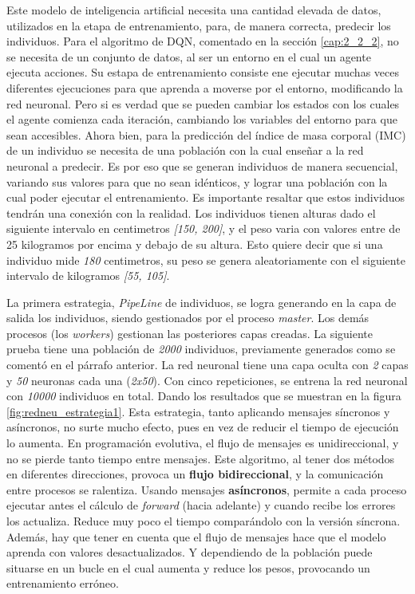 	Este modelo de inteligencia artificial necesita una cantidad elevada de datos, utilizados en la etapa de entrenamiento, para, de manera correcta, predecir los individuos. Para el algoritmo de DQN, comentado en la sección \ref{cap:2_2_2}, no se necesita de un conjunto de datos, al ser un entorno en el cual un agente ejecuta acciones. Su estapa de entrenamiento consiste ene ejecutar muchas veces diferentes ejecuciones para que aprenda a moverse por el entorno, modificando la red neuronal. Pero si es verdad que se pueden cambiar los estados con los cuales el agente comienza cada iteración, cambiando los variables del entorno para que sean accesibles. Ahora bien, para la predicción del índice de masa corporal (IMC) de un individuo se necesita de una población con la cual enseñar a la red neuronal a predecir. Es por eso que se generan individuos de manera secuencial, variando sus valores para que no sean idénticos, y lograr una población con la cual poder ejecutar el entrenamiento. Es importante resaltar que estos individuos tendrán una conexión con la realidad. Los individuos tienen alturas dado el siguiente intervalo en centimetros \textit{[150, 200]}, y el peso varia con valores entre de 25 kilogramos por encima y debajo de su altura. Esto quiere decir que si una individuo mide \textit{180} centimetros, su peso se genera aleatoriamente con el siguiente intervalo de kilogramos \textit{[55, 105]}.
		
	
		La primera estrategia, \textit{PipeLine} de individuos, se logra generando en la capa de salida los individuos, siendo gestionados por el proceso \textit{master}. Los demás procesos (los \textit{workers}) gestionan las posteriores capas creadas. La siguiente prueba tiene una población de \textit{2000} individuos, previamente generados como se comentó en el párrafo anterior. La red neuronal tiene una capa oculta con \textit{2} capas y \textit{50} neuronas cada una (\textit{2x50}). Con cinco repeticiones, se entrena la red neuronal con \textit{10000} individuos en total. Dando los resultados que se muestran en la figura \ref{fig:redneu_estrategia1}. Esta estrategia, tanto aplicando mensajes síncronos y asíncronos, no surte mucho efecto, pues en vez de reducir el tiempo de ejecución lo aumenta. En programación evolutiva, el flujo de mensajes es unidireccional, y no se pierde tanto tiempo entre mensajes. Este algoritmo, al tener dos métodos en diferentes direcciones, provoca un \textbf{flujo bidireccional}, y la comunicación entre procesos se ralentiza. Usando mensajes \textbf{asíncronos}, permite a cada proceso ejecutar antes el cálculo de \textit{forward} (hacia adelante) y cuando recibe los errores los actualiza. Reduce muy poco el tiempo comparándolo con la versión síncrona. Además, hay que tener en cuenta que el flujo de mensajes hace que el modelo aprenda con valores desactualizados. Y dependiendo de la población puede situarse en un bucle en el cual aumenta y reduce los pesos, provocando un entrenamiento erróneo.



